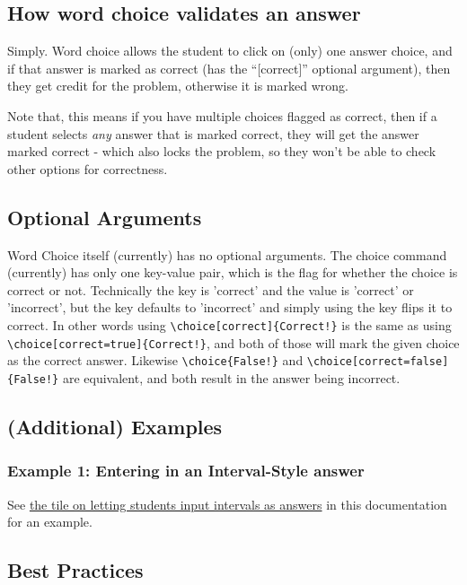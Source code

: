 \documentclass{ximera}
\begin{document}
    \subsection*{How word choice validates an answer}
    
        Simply. Word choice allows the student to click on (only) one answer choice, and if that answer is marked as correct (has the ``[correct]'' optional argument), then they get credit for the problem, otherwise it is marked wrong.
        
        Note that, this means if you have multiple choices flagged as correct, then if a student selects \textit{any} answer that is marked correct, they will get the answer marked correct - which also locks the problem, so they won't be able to check other options for correctness.

    \subsection*{Optional Arguments}
        
        Word Choice itself (currently) has no optional arguments. The choice command (currently) has only one key-value pair, which is the flag for whether the choice is correct or not. Technically the key is 'correct' and the value is 'correct' or 'incorrect', but the key defaults to 'incorrect' and simply using the key flips it to correct. In other words using \verb|\choice[correct]{Correct!}| is the same as using \verb|\choice[correct=true]{Correct!}|, and both of those will mark the given choice as the correct answer. Likewise \verb|\choice{False!}| and \verb|\choice[correct=false]{False!}| are equivalent, and both result in the answer being incorrect.

    \subsection*{(Additional) Examples}
    
        \subsubsection*{Example 1: Entering in an Interval-Style answer}
            See \href{https://xronos.clas.ufl.edu/examples/exampleCore/problemDesign/intervals}{the tile on letting students input intervals as answers} in this documentation for an example.
        
    \subsection*{Best Practices}
    
\end{document}
